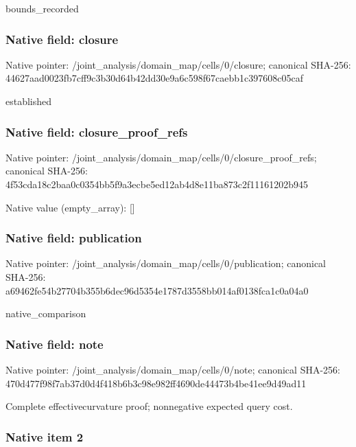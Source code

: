 \documentclass[10pt,a4paper]{article}
\begin{document}
bounds\_recorded


\subsubsection{Native field: closure}


Native pointer: /joint\_analysis/domain\_m\allowbreak{}ap/cells/0/closure; canonical SHA-256: 44627aad0023fb7cff9c3b30\allowbreak{}d64b42dd30e9a6c598f67cae\allowbreak{}bb1c397608c05caf


established


\subsubsection{Native field: closure\_proof\_refs}


Native pointer: /joint\_analysis/domain\_m\allowbreak{}ap/cells/0/closure\_proof\allowbreak{}\_refs; canonical SHA-256: 4f53cda18c2baa0c0354bb5f\allowbreak{}9a3ecbe5ed12ab4d8e11ba87\allowbreak{}3c2f11161202b945



Native value (empty\_array): []



\subsubsection{Native field: publication}


Native pointer: /joint\_analysis/domain\_m\allowbreak{}ap/cells/0/publication; canonical SHA-256: a69462fe54b27704b355b6de\allowbreak{}c96d5354e1787d3558bb014a\allowbreak{}f0138fca1c0a04a0


native\_comparison


\subsubsection{Native field: note}


Native pointer: /joint\_analysis/domain\_map/cells/0/note; canonical SHA-256: 470d477f98f7ab37d0d4f418\allowbreak{}b6b3c98e982ff4690de44473\allowbreak{}b4be41ee9d49ad11


Complete effectivecurvature proof; nonnegative expected query cost.


\subsubsection{Native item 2}
\end{document}
